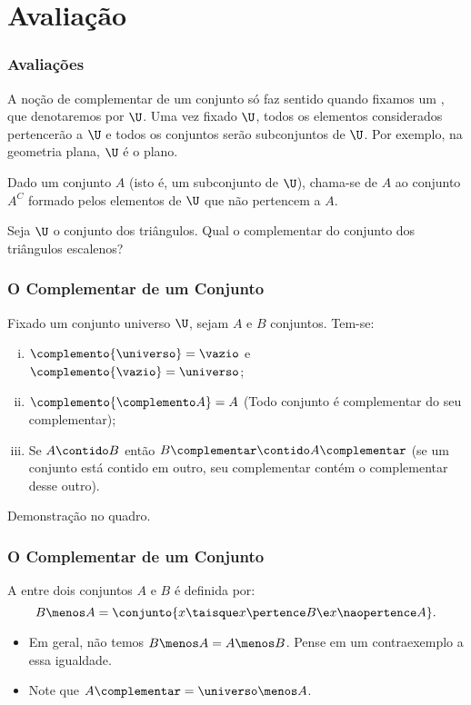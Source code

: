 \section{Avaliação}


\begin{frame}
	\frametitle{Avaliações}

	A noção de complementar de um conjunto só faz sentido quando fixamos um , que denotaremos por $\U$. Uma vez fixado $\U$, todos os elementos considerados pertencerão a $\U$ e todos os conjuntos serão subconjuntos de $\U$. Por exemplo, na geometria plana, $\U$ é o plano.

	\begin{definicao}
		Dado um conjunto $A$ (isto é, um subconjunto de $\U$), chama-se  de $A$ ao conjunto $A^C$ formado pelos elementos de $\U$ que não pertencem a $A$.
	\end{definicao}

	\begin{exemplo}
		Seja $\U$ o conjunto dos triângulos. Qual o complementar do conjunto dos triângulos escalenos?
	\end{exemplo}
\end{frame}


\begin{frame}
	\frametitle{O Complementar de um Conjunto}

	\begin{proposicao}
		\label{prop-comp}
		Fixado um conjunto universo $\U$, sejam $A$ e $B$ conjuntos. Tem-se:
		\begin{enumerate}[i.]
			\item $\complemento{\universo} = \vazio$ e $\complemento{\vazio} = \universo$;
			\item $\complemento{\complemento A} = A$ (Todo conjunto é complementar do seu complementar);
			\item Se $A \contido B$ então $B\complementar \contido A\complementar$ (se um conjunto está contido em outro, seu complementar contém o complementar desse outro).
		\end{enumerate}
	\end{proposicao}

	Demonstração no quadro.
\end{frame}


\begin{frame}
	\frametitle{O Complementar de um Conjunto}

	\begin{definicao}
		A  entre dois conjuntos $A$ e $B$ é definida por:
		\[
			B \menos A = \conjunto { x \taisque x \pertence B \e x \naopertence A}.
		\]
	\end{definicao}

	\begin{itemize}
		\item Em geral, não temos $B \menos A = A \menos B$. Pense em um contraexemplo a essa igualdade.
		\item Note que $A\complementar = \universo \menos A$.
	\end{itemize}
\end{frame}